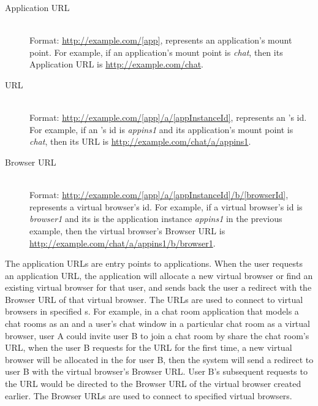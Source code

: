 \begin{description}

\item[Application URL] \label{itm:appurl} \hfill \\
Format: \url{http://example.com/[app]}, \code{[app]} represents an
application's mount point.   For example, if an application's mount point is
\emph{chat},  then its Application URL is \url{http://example.com/chat}.


\item[\appins{} URL] \label{itm:appinsurl} \hfill \\
Format: \url{http://example.com/[app]/a/[appInstanceId]},
\code{[appInstanceId]} represents an \appins{}'s id.  For example, if an
\appins{}'s id is \emph{appins1} and its application's mount point is
\emph{chat}, then its \appins{} URL is
\url{http://example.com/chat/a/appins1}.


\item[Browser URL] \label{itm:vburl} \hfill \\
Format: \url{http://example.com/[app]/a/[appInstanceId]/b/[browserId]},
\code{[browserId]} represents a virtual browser's id. For example, if a
virtual browser's id is \emph{browser1} and its \appins{} is the application
instance \emph{appins1} in the previous example, then the virtual browser's
Browser URL is \url{http://example.com/chat/a/appins1/b/browser1}.

\end{description}

The application URLs are entry points to applications. When the user requests
 an application URL, the application will allocate a new virtual browser or
find an existing virtual browser for that user, and sends back the user a
redirect with the Browser URL of that virtual browser. The \appins URLs are
used to connect to virtual browsers in specified \appins{}s. For example, in a
chat room application that models a chat rooms as an \appins{} and a user's
chat window in a particular chat room  as a virtual browser, user A could
invite user B to join a chat room by share the chat room's \appins URL, when
the user B requests for the \appins URL for the first time, a new virtual
browser will be allocated in the \appins for user B, then the system will send
a redirect to user B with the virtual browser's Browser URL. User B's
subsequent requests to the \appins URL would be directed to the Browser URL of
the virtual browser created earlier. The Browser URLs are used to connect to
specified virtual browsers.


